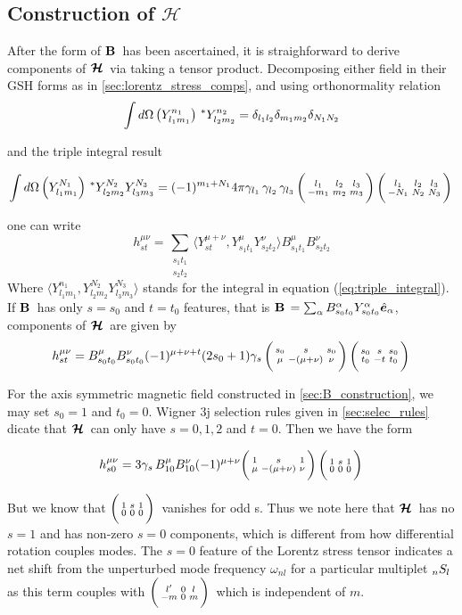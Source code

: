 \subsection{Construction of $\mathcal{H}$}

After the form of $\mathbf{B}\,$ has been ascertained, it is straighforward to derive components of $\bm{\mathcal{H}}\,$ via taking a tensor product. Decomposing either field in their GSH forms as in \ref{sec:lorentz_stress_comps}, and using orthonormality relation
\begin{equation}
\int d\Omega \left( Y_{l_1m_1}^{n_1} \right)\,^*Y_{l_2m_2}^{n_2} = \delta_{l_1l_2}\delta_{m_1m_2}\delta_{N_1N_2}
\end{equation}

and the triple integral result

\begin{equation}\label{eq:triple_integral}
\int d\Omega \left( Y_{l_1m_1}^{N_1} \right)\,^*Y_{l_2m_2}^{N_2}  Y_{l_3m_3}^{N_3}= (-1)^{m_1+N_1}4\pi \gamma_{l_1}\,\gamma_{l_2}\,\gamma_{l_3}\, \bigg(\begin{smallmatrix} l_1 & l_2 & l_3 \\-m_1 & m_2 & m_3 \end{smallmatrix}\bigg)\, \bigg(\begin{smallmatrix} l_1 & l_2 & l_3 \\-N_1 & N_2 & N_3 \end{smallmatrix}\bigg)\,
\end{equation}

one can write
\begin{equation}
h^{\mu\nu}_{st} = \sum_{\substack{s_1t_1\\ s_2t_2}} \langle Y_{st}^{\mu+\nu}, Y_{s_1 t_1}^{\mu}  Y_{s_2 t_2}^{\nu}\rangle B_{s_1t_1}^{\mu} B_{s_2t_2}^{\nu}
\label{eqn:h_B_relation}
\end{equation}
Where $\langle Y_{l_1m_1}^{n_1}, Y_{l_2m_2}^{N_2}  Y_{l_3m_3}^{N_3}\rangle$ stands for the integral in equation (\ref{eq:triple_integral}).
If $\mathbf{B}\,$ has only $s=s_0$ and $t=t_0$ features, that is $\mathbf{B}\, = \sum_{\alpha}B_{s_0t_0}^{\alpha}Y_{s_0t_0}^{\alpha} \hat{\bm{e}}_{\alpha}$, components of $\bm{\mathcal{H}}\,$ are given by
\begin{equation}\label{eq:single_feature_B}
h_{st}^{\mu\nu} = B^{\mu}_{s_0 t_0}B^{\nu}_{s_0 t_0} (-1)^{\mu + \nu + t} (2s_0+1) \gamma_{s}\, \bigg(\begin{smallmatrix} s_0 & s & s_0 \\\mu & -(\mu+\nu) & \nu \end{smallmatrix}\bigg)\, \bigg(\begin{smallmatrix} s_0 & s & s_0 \\t_0 & -t & t_0 \end{smallmatrix}\bigg)\,
\end{equation}

For the axis symmetric magnetic field constructed in \ref{sec:B_construction}, we may set $s_0=1$ and $t_0=0$. Wigner 3j selection rules given in \ref{sec:selec_rules} dicate that $\bm{\mathcal{H}}\,$ can only have $s=0,1,2$ and $t=0$. Then we have the form
 	
\begin{equation}
h_{s0}^{\mu\nu} = 3 \gamma_{s}\, B^{\mu}_{10}B^{\nu}_{10} (-1)^{\mu + \nu} \bigg(\begin{smallmatrix} 1 & s & 1 \\\mu & -(\mu+\nu) & \nu \end{smallmatrix}\bigg)\, \bigg(\begin{smallmatrix} 1 & s & 1 \\0 & 0 & 0 \end{smallmatrix}\bigg)\,
\end{equation}

But we know that $\bigg(\begin{smallmatrix} 1 & s & 1 \\0 & 0 & 0 \end{smallmatrix}\bigg)\,$ vanishes for odd s. Thus we note here that $\bm{\mathcal{H}}\,$ has no $s=1$ and has non-zero $s=0$ components, which is different from how differential rotation couples modes. The $s=0$ feature of the Lorentz stress tensor indicates a net shift from the unperturbed mode frequency $\omega_{{nl}}$ for a particular multiplet $_{n}S_{l}\,$ as this term couples with $\bigg(\begin{smallmatrix} l' & 0 & l \\-m & 0 & m \end{smallmatrix}\bigg)\,$ which is independent of $m$.